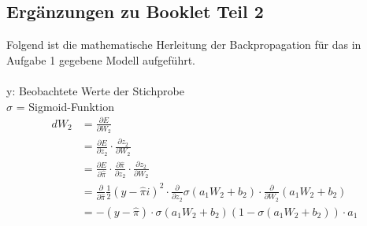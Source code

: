 \subsection{Ergänzungen zu Booklet Teil 2} \label{app:ergaenzung_booklet_2}
Folgend ist die mathematische Herleitung der Backpropagation für das in Aufgabe 1 gegebene Modell aufgeführt.\\\\
y: Beobachtete Werte der Stichprobe\\
$\sigma$ = Sigmoid-Funktion
\begin{align*}
dW_{2} &= \frac{\partial E}{\partial W_{2}}\\
&= \frac{\partial E}{\partial z_{2}}\cdot \frac{\partial z_{2}}{\partial W_{2}}\\
&= \frac{\partial E}{\partial \hat{\pi}} \cdot \frac{\partial \hat{\pi}}{\partial z_{2}} \cdot \frac{\partial z_{2}}{\partial W_{2}}\\
&= \frac{\partial }{\partial \hat{\pi}} \frac{1}{2}(y-\hat{\pi}i)^{2} \cdot \frac{\partial }{\partial z_{2}} \sigma(a_{1}W_{2} + b_{2})\cdot \frac{\partial }{\partial W_{2}}(a_{1}W_{2}+b_{2})\\
&= -(y-\hat{\pi}) \cdot \sigma(a_{1}W_{2}+b_{2})(1-\sigma(a_{1}W_{2}+b_{2}))\cdot a_{1}\\

\end{align*}

